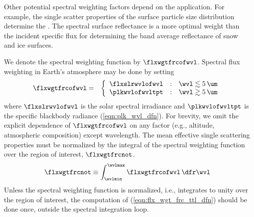 \documentclass[12pt]{article}
\begin{document}
Other potential spectral weighting factors depend on the application.
For example, the single scatter properties of the surface particle
size distribution determine the .
The spectral surface reflectance is a more optimal weight than the
incident specific flux for determining the band average reflectance of
snow and ice surfaces.

We denote the spectral weighting function by $\flxwgtfrcofwvl$.
Spectral flux weighting in Earth's atmosphere may be done by setting
\begin{eqnarray}
\flxwgtfrcofwvl & = & \left\{
\begin{array}{r@{\quad:\quad}ll}
\flxslrwvlofwvl & \wvl \lesssim 5\,\um \\
\plkwvlofwvltpt & \wvl \gtrsim 5\,\um
\end{array} \right.
\label{eqn:flx_wgt_frc_dfn}
\end{eqnarray}
where $\flxslrwvlofwvl$ is the solar spectral irradiance and
$\plkwvlofwvltpt$ is the specific blackbody radiance
(\ref{eqn:plk_wvl_dfn}). 
For brevity, we omit the explicit dependence of $\flxwgtfrcofwvl$ on
any factor (e.g., altitude, atmospheric composition) except wavelength.  
The mean effective single scattering properties must be normalized
by the integral of the spectral weighting function over the region of
interest, $\flxwgtfrcnot$. 
\begin{equation}
\flxwgtfrcnot \equiv \int_{\wvlmin}^{\wvlmax} \flxwgtfrcofwvl \,\dfr\wvl
\label{eqn:flx_wgt_frc_ttl_dfn}
\end{equation}
Unless the spectral weighting function is normalized, i.e., integrates
to unity over the region of interest, the computation of
(\ref{eqn:flx_wgt_frc_ttl_dfn}) should be done once, outside the
spectral integration loop.
\end{document}
